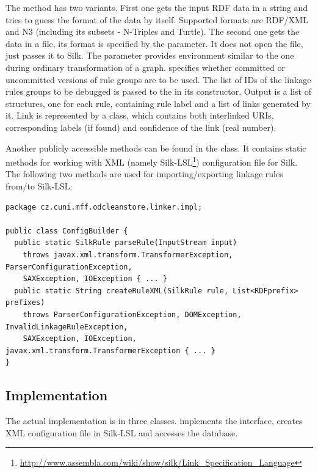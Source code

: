 The  method has two variants. First one gets the input RDF data in a string and tries to guess the format of the data by itself. Supported formats are RDF/XML and N3 (including its subsets - N-Triples and Turtle). The second one gets the data in a file, its format is specified by the  parameter. It does not open the file, just passes it to Silk. The  parameter provides environment similar to the one during ordinary transformation of a graph.  specifies whether committed or uncommitted versions of rule groups are to be used. The list of IDs of the linkage rules groups to be debugged is passed to the  in its constructor. Output is a list of structures, one for each rule, containing rule label and a list of links generated by it. Link is represented by a  class, which contains both interlinked URIs, corresponding labels (if found) and confidence of the link (real number).

Another publicly accessible methods can be found in the  class. It contains static methods for working with XML (namely Silk-LSL\footnote{\url{http://www.assembla.com/wiki/show/silk/Link\_Specification\_Language}}) configuration file for Silk. The following two methods are used for importing/exporting linkage rules from/to Silk-LSL:

\begin{lstlisting}[caption=ConfigBuilder interface,label=lst:configBuilder]
package cz.cuni.mff.odcleanstore.linker.impl;

public class ConfigBuilder {
  public static SilkRule parseRule(InputStream input)
    throws javax.xml.transform.TransformerException, ParserConfigurationException,
    SAXException, IOException { ... }
  public static String createRuleXML(SilkRule rule, List<RDFprefix> prefixes) 
    throws ParserConfigurationException, DOMException, InvalidLinkageRuleException, 
    SAXException, IOException, javax.xml.transform.TransformerException { ... }
}
\end{lstlisting}

\subsection{Implementation}

The actual implementation is in three classes.  implements the  interface,  creates XML configuration file in Silk-LSL and  accesses the database.

